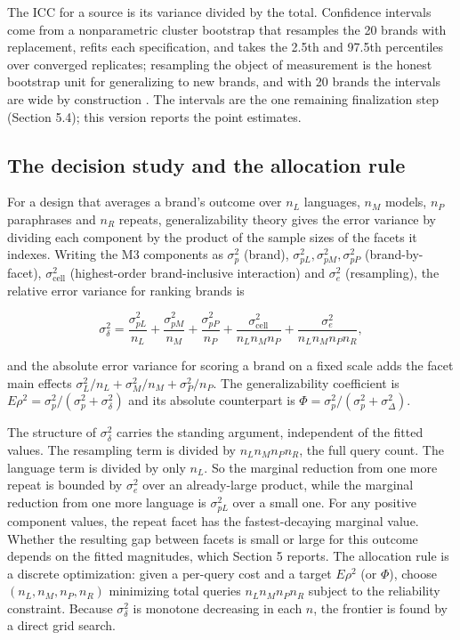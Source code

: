 \documentclass[pdflatex,sn-mathphys-num]{sn-jnl}
\begin{document}
The ICC for a source is its variance divided by the total. Confidence intervals come from a nonparametric cluster bootstrap that resamples the 20 brands with replacement, refits each specification, and takes the 2.5th and 97.5th percentiles over converged replicates; resampling the object of measurement is the honest bootstrap unit for generalizing to new brands, and with 20 brands the intervals are wide by construction \cite{ref7}. The intervals are the one remaining finalization step (Section 5.4); this version reports the point estimates.

\subsection{The decision study and the allocation rule}\label{the-decision-study-and-the-allocation-rule}

For a design that averages a brand's outcome over \(n_L\) languages, \(n_M\) models, \(n_P\) paraphrases and \(n_R\) repeats, generalizability theory gives the error variance by dividing each component by the product of the sample sizes of the facets it indexes. Writing the M3 components as \(\sigma^2_{p}\) (brand), \(\sigma^2_{pL},\sigma^2_{pM},\sigma^2_{pP}\) (brand-by-facet), \(\sigma^2_{\text{cell}}\) (highest-order brand-inclusive interaction) and \(\sigma^2_{e}\) (resampling), the relative error variance for ranking brands is

\[
\sigma^2_\delta = \frac{\sigma^2_{pL}}{n_L} + \frac{\sigma^2_{pM}}{n_M} + \frac{\sigma^2_{pP}}{n_P} + \frac{\sigma^2_{\text{cell}}}{n_L n_M n_P} + \frac{\sigma^2_{e}}{n_L n_M n_P n_R},
\]

and the absolute error variance for scoring a brand on a fixed scale adds the facet main effects \(\sigma^2_L/n_L + \sigma^2_M/n_M + \sigma^2_P/n_P\). The generalizability coefficient is \(E\rho^2 = \sigma^2_p / (\sigma^2_p + \sigma^2_\delta)\) and its absolute counterpart is \(\Phi = \sigma^2_p / (\sigma^2_p + \sigma^2_\Delta)\).

The structure of \(\sigma^2_\delta\) carries the standing argument, independent of the fitted values. The resampling term is divided by \(n_L n_M n_P n_R\), the full query count. The language term is divided by only \(n_L\). So the marginal reduction from one more repeat is bounded by \(\sigma^2_e\) over an already-large product, while the marginal reduction from one more language is \(\sigma^2_{pL}\) over a small one. For any positive component values, the repeat facet has the fastest-decaying marginal value. Whether the resulting gap between facets is small or large for this outcome depends on the fitted magnitudes, which Section 5 reports. The allocation rule is a discrete optimization: given a per-query cost and a target \(E\rho^2\) (or \(\Phi\)), choose \((n_L, n_M, n_P, n_R)\) minimizing total queries \(n_L n_M n_P n_R\) subject to the reliability constraint. Because \(\sigma^2_\delta\) is monotone decreasing in each \(n\), the frontier is found by a direct grid search.
\end{document}
